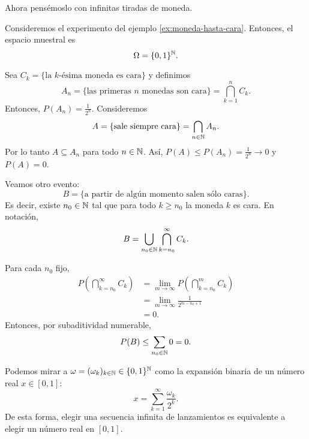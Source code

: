 Ahora pensémoslo con infinitas tiradas de moneda.

\begin{example}
    Consideremos el experimento del ejemplo \ref{ex:moneda-hasta-cara}. Entonces, el espacio muestral es
    \begin{equation*}
        \Omega = \{0,1\}^{\mathbb{N}}.
    \end{equation*}

    Sea $C_k = \{ \text{la $k$-ésima moneda es cara} \}$ y definimos
    \begin{equation*}
        A_n = \{\text{las primeras $n$ monedas son cara}\}
        = \bigcap_{k=1}^n C_k.
    \end{equation*}
    Entonces, $P(A_n) = \frac{1}{2^n}$. Consideremos
    \begin{equation*}
        A = \{ \text{sale siempre cara} \} = \bigcap_{n \in \mathbb{N}} A_n.
    \end{equation*}
    Por lo tanto $A \subseteq A_n$ para todo $n \in \mathbb{N}$. Así, $P(A) \leq P(A_n) = \frac{1}{2^n} \to 0$ y $P(A) = 0$.

    Veamos otro evento:
    \begin{equation*}
        B = \{\text{a partir de algún momento salen sólo caras}\}.
    \end{equation*}
    Es decir, existe $n_0 \in \mathbb{N}$ tal que para todo $k \geq n_0$ la moneda $k$ es cara. En notación,
    \begin{equation*}
        B = \bigcup_{n_0 \in \mathbb{N}} \bigcap_{k=n_0}^\infty C_k.
    \end{equation*}

    Para cada $n_0$ fijo,
    \begin{align*}
        P\left(\bigcap_{k=n_0}^\infty C_k\right)
        &= \lim_{m \to \infty} P\left(\bigcap_{k=n_0}^m C_k\right) \\
        &= \lim_{m \to \infty} \frac{1}{2^{m-n_0+1}} \\
        &= 0.
    \end{align*}
    Entonces, por subaditividad numerable,
    \begin{equation*}
        P(B) \leq \sum_{n_0 \in \mathbb{N}} 0 = 0.
    \end{equation*}
\end{example}

Podemos mirar a $\omega = (\omega_k)_{k \in \mathbb{N}} \in \{0,1\}^{\mathbb{N}}$ como la expansión binaria de un número real $x \in [0,1]$:
\begin{equation*}
    x = \sum_{k=1}^\infty \frac{\omega_k}{2^k}.
\end{equation*}
De esta forma, elegir una secuencia infinita de lanzamientos es equivalente a elegir un número real en $[0,1]$.

